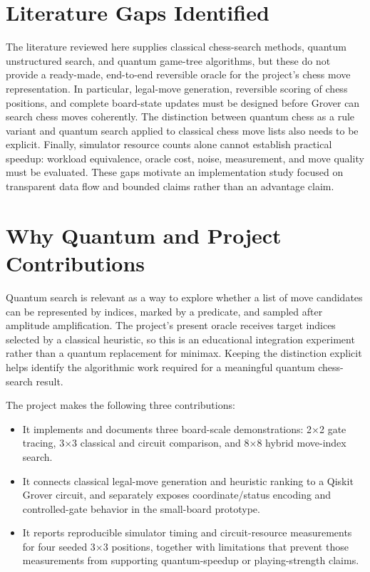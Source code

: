 \documentclass[conference]{IEEEtran}
\begin{document}
\section{Literature Gaps Identified}
The literature reviewed here supplies classical chess-search methods, quantum unstructured search, and quantum game-tree algorithms, but these do not provide a ready-made, end-to-end reversible oracle for the project's chess move representation. In particular, legal-move generation, reversible scoring of chess positions, and complete board-state updates must be designed before Grover can search chess moves coherently. The distinction between quantum chess as a rule variant and quantum search applied to classical chess move lists also needs to be explicit. Finally, simulator resource counts alone cannot establish practical speedup: workload equivalence, oracle cost, noise, measurement, and move quality must be evaluated. These gaps motivate an implementation study focused on transparent data flow and bounded claims rather than an advantage claim.

\section{Why Quantum and Project Contributions}
Quantum search is relevant as a way to explore whether a list of move candidates can be represented by indices, marked by a predicate, and sampled after amplitude amplification. The project's present oracle receives target indices selected by a classical heuristic, so this is an educational integration experiment rather than a quantum replacement for minimax. Keeping the distinction explicit helps identify the algorithmic work required for a meaningful quantum chess-search result.

The project makes the following three contributions:
\begin{itemize}
  \item It implements and documents three board-scale demonstrations: 2$\times$2 gate tracing, 3$\times$3 classical and circuit comparison, and 8$\times$8 hybrid move-index search.
  \item It connects classical legal-move generation and heuristic ranking to a Qiskit Grover circuit, and separately exposes coordinate/status encoding and controlled-gate behavior in the small-board prototype.
  \item It reports reproducible simulator timing and circuit-resource measurements for four seeded 3$\times$3 positions, together with limitations that prevent those measurements from supporting quantum-speedup or playing-strength claims.
\end{itemize}
\end{document}
